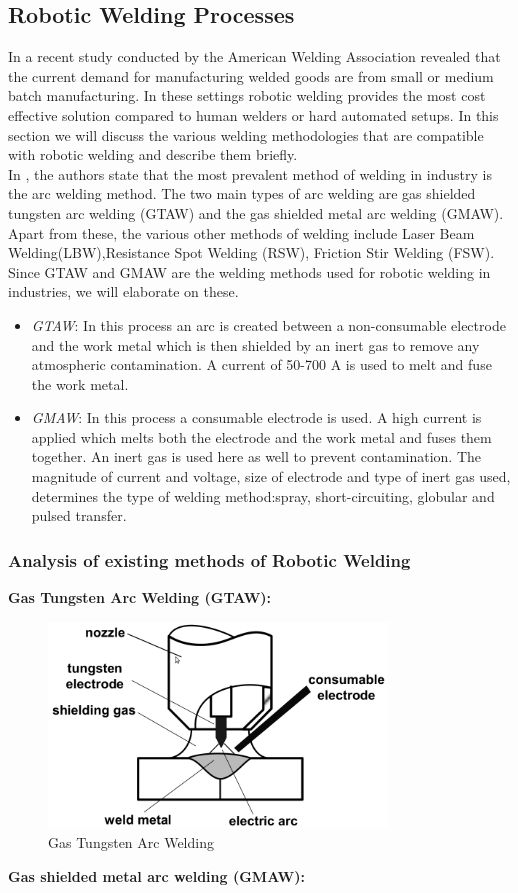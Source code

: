 \newpage
\subsection{Robotic Welding Processes}
In a recent study conducted by the American Welding Association revealed that the current demand for manufacturing welded goods are from small or medium batch manufacturing. In these settings robotic welding provides the most cost effective solution compared to human welders or hard automated setups. In this section we will discuss the various welding methodologies that are compatible with robotic welding and describe them briefly.\\
In \citet{Pires2003}, the authors state that the most prevalent method of welding in industry is the arc welding method. The two main types of arc welding are gas shielded tungsten arc welding (GTAW) and the gas shielded metal arc welding (GMAW). Apart from these, the various other methods of welding include Laser Beam Welding(LBW),Resistance Spot Welding (RSW), Friction Stir Welding (FSW).
Since GTAW and GMAW are the welding methods used for robotic welding in industries, we will elaborate on these.
\begin{itemize}
\item \textit{GTAW}: In this process an arc is created between a non-consumable electrode and the work metal which is then shielded by an inert gas to remove any atmospheric contamination. A current of 50-700 A is used to melt and fuse the work metal.
\item \textit{GMAW}: In this process a consumable electrode is used. A high current is applied which melts both the electrode and the work metal and fuses them together. An inert gas is used here as well to prevent contamination. The magnitude of current and voltage, size of electrode and type of inert gas used, determines the type of welding method:spray, short-circuiting, globular and pulsed transfer.
\end{itemize}

\subsubsection{Analysis of existing methods of Robotic Welding}
\textbf{Gas Tungsten Arc Welding (GTAW):}
\begin{figure}[htbp] %
 \centering
   \includegraphics[width=9cm]{images/GTAW.png}
   \caption[Gas Tungsten Arc Welding \citet{Pires2003}]
   {Gas Tungsten Arc Welding \citet{Pires2003}}  
\label{fig:img2}
\end{figure}
\newpage
\textbf{Gas shielded metal arc welding (GMAW):}


